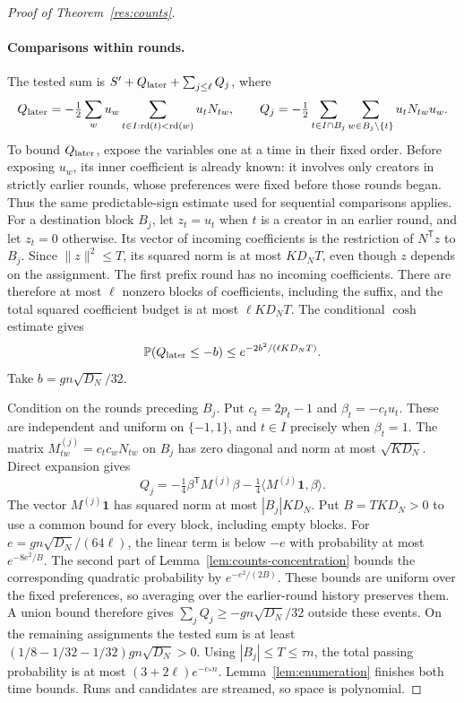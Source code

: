 \documentclass[11pt,a4paper]{article}
\theoremstyle{definition}
\theoremstyle{remark}
\newcommand{\Prb}{\mathbb P}
\newcommand{\ind}{\mathbf 1}
\begin{document}
\begin{proof}[Proof of Theorem~\ref{res:counts}]
\paragraph{Comparisons within rounds.}
The tested sum is $S'+Q_{\rm later}+\sum_{j\le\ell}Q_j$, where
\[
 Q_{\rm later}=-\tfrac12\sum_wu_w
        \sum_{t\in I:\operatorname{rd}(t)<\operatorname{rd}(w)}u_tN_{tw},\qquad
 Q_j=-\tfrac12\sum_{t\in I\cap B_j}\sum_{w\in B_j\setminus\{t\}}u_tN_{tw}u_w.
\]
To bound $Q_{\rm later}$, expose the variables one at a time in their
fixed order. Before exposing $u_w$, its inner coefficient is already
known: it involves only creators in strictly earlier rounds, whose
preferences were fixed before those rounds began. Thus the same
predictable-sign estimate used for sequential comparisons applies.
For a destination block $B_j$, let $z_t=u_t$ when $t$ is a creator in an
earlier round, and let $z_t=0$ otherwise. Its vector of incoming
coefficients is the restriction of $N^{\mathsf T}z$ to $B_j$. Since
$\|z\|^2\le T$, its squared norm is at most $KD_NT$, even though $z$
depends on the assignment. The first prefix round has no incoming
coefficients. There are therefore at most $\ell$ nonzero blocks of
coefficients, including the suffix, and the total squared coefficient
budget is at most $\ell KD_NT$. The conditional $\cosh$ estimate gives
\[
 \Prb(Q_{\rm later}\le-b)\le e^{-2b^2/(\ell KD_NT)}.
\]
Take $b=gn\sqrt{D_N}/32$.

Condition on the rounds preceding $B_j$. Put $c_t=2p_t-1$ and
$\beta_t=-c_tu_t$. These are independent and uniform on $\{-1,1\}$, and
$t\in I$ precisely when $\beta_t=1$. The matrix
$M^{(j)}_{tw}=c_tc_wN_{tw}$ on $B_j$ has zero diagonal and norm at most
$\sqrt{KD_N}$. Direct expansion gives
\[
 Q_j=-\tfrac14\beta^{\mathsf T}M^{(j)}\beta
          -\tfrac14\langle M^{(j)}\ind,\beta\rangle.
\]
The vector $M^{(j)}\ind$ has squared norm at most $|B_j|KD_N$.
Put $B=TKD_N>0$ to use a common bound for every block, including empty
blocks. For $e=gn\sqrt{D_N}/(64\ell)$, the linear term is below $-e$ with
probability at most $e^{-8e^2/B}$. The second part of
Lemma~\ref{lem:counts-concentration} bounds the corresponding quadratic
probability by $e^{-e^2/(2B)}$. These bounds are uniform over the fixed
preferences, so averaging over the earlier-round history preserves them.
A union bound therefore gives $\sum_jQ_j\ge-gn\sqrt{D_N}/32$ outside
these events. On the remaining assignments the tested sum is at least
$(1/8-1/32-1/32)gn\sqrt{D_N}>0$.
Using $|B_j|\le T\le\tau n$, the total passing probability is at most
$(3+2\ell)e^{-c_*n}$. Lemma~\ref{lem:enumeration} finishes both time
bounds. Runs and candidates are streamed, so space is polynomial.
\end{proof}
\end{document}
